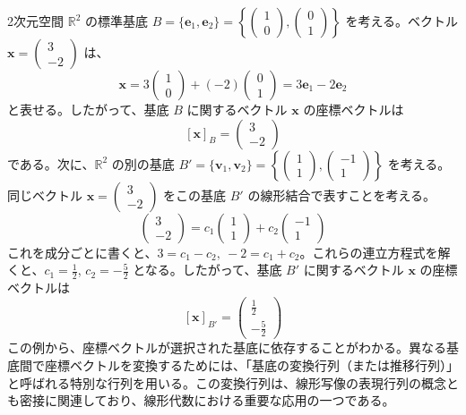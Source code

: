 \begin{ex}[座標ベクトルの例]
2次元空間 $\mathbb{R}^2$ の標準基底 $B = \{\bm{e}_1, \bm{e}_2\} = \left\{ \begin{pmatrix} 1 \\ 0 \end{pmatrix}, \begin{pmatrix} 0 \\ 1 \end{pmatrix} \right\}$ を考える。ベクトル $\bm{x} = \begin{pmatrix} 3 \\ -2 \end{pmatrix}$ は、
\[ \bm{x} = 3 \begin{pmatrix} 1 \\ 0 \end{pmatrix} + (-2) \begin{pmatrix} 0 \\ 1 \end{pmatrix} = 3\bm{e}_1 - 2\bm{e}_2 \]
と表せる。したがって、基底 $B$ に関するベクトル $\bm{x}$ の座標ベクトルは
\[ [\bm{x}]_B = \begin{pmatrix} 3 \\ -2 \end{pmatrix} \]
である。次に、$\mathbb{R}^2$ の別の基底 $B' = \{\bm{v}_1, \bm{v}_2\} = \left\{ \begin{pmatrix} 1 \\ 1 \end{pmatrix}, \begin{pmatrix} -1 \\ 1 \end{pmatrix} \right\}$ を考える。同じベクトル $\bm{x} = \begin{pmatrix} 3 \\ -2 \end{pmatrix}$ をこの基底 $B'$ の線形結合で表すことを考える。
\[ \begin{pmatrix} 3 \\ -2 \end{pmatrix} = c_1 \begin{pmatrix} 1 \\ 1 \end{pmatrix} + c_2 \begin{pmatrix} -1 \\ 1 \end{pmatrix} \]
これを成分ごとに書くと、$3 = c_1 - c_2,\ -2 = c_1 + c_2$。これらの連立方程式を解くと、$c_1 = \frac{1}{2}$, $c_2 = -\frac{5}{2}$ となる。したがって、基底 $B'$ に関するベクトル $\bm{x}$ の座標ベクトルは
\[ [\bm{x}]_{B'} = \begin{pmatrix} \frac{1}{2} \\ -\frac{5}{2} \end{pmatrix} \]
この例から、座標ベクトルが選択された基底に依存することがわかる。異なる基底間で座標ベクトルを変換するためには、「基底の変換行列（または推移行列）」と呼ばれる特別な行列を用いる。この変換行列は、線形写像の表現行列の概念とも密接に関連しており、線形代数における重要な応用の一つである。
\end{ex}

